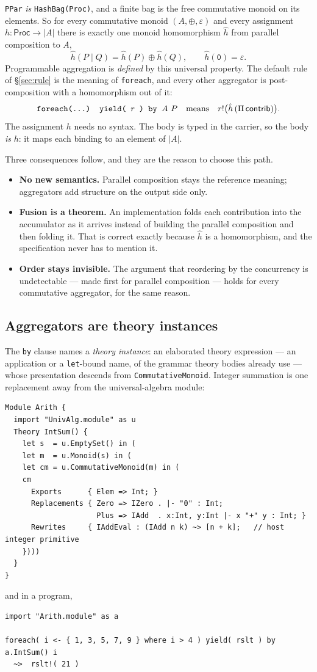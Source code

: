 \documentclass[11pt]{article}
\theoremstyle{branddef}
\theoremstyle{brandplain}
\theoremstyle{brandrem}
\newcommand{\Proc}{\mathsf{Proc}}
\newcommand{\fe}{\texttt{foreach}}
\begin{document}
\texttt{PPar} \emph{is} \texttt{HashBag(Proc)}, and a finite bag is the free
commutative monoid on its elements. So for every commutative monoid
\((A, \oplus, \varepsilon)\) and every assignment \(h : \Proc \to |A|\) there is
exactly one monoid homomorphism \(\hat h\) from parallel composition to \(A\),
\[
\hat h(P \mid Q) = \hat h(P) \oplus \hat h(Q),
\qquad
\hat h(\texttt{0}) = \varepsilon .
\]
Programmable aggregation is \emph{defined} by this universal property. The
default rule of \S\ref{sec:rule} is the meaning of \fe{}, and every other
aggregator is post-composition with a homomorphism out of it:
\[
\texttt{foreach(\dots) yield( }r\texttt{ ) by }A\ P
\quad\text{means}\quad
r!\big(\hat h\,(\Pi\,\mathsf{contrib})\big).
\]
The assignment \(h\) needs no syntax. The body is typed in the carrier, so the
body \emph{is} \(h\): it maps each binding to an element of \(|A|\).

Three consequences follow, and they are the reason to choose this path.
\begin{itemize}[nosep]
\item \textbf{No new semantics.} Parallel composition stays the reference
meaning; aggregators add structure on the output side only.
\item \textbf{Fusion is a theorem.} An implementation folds each contribution
into the accumulator as it arrives instead of building the parallel composition
and then folding it. That is correct exactly because \(\hat h\) is a
homomorphism, and the specification never has to mention it.
\item \textbf{Order stays invisible.} The argument that reordering by the
concurrency is undetectable --- made first for parallel composition --- holds for
every commutative aggregator, for the same reason.
\end{itemize}

\subsection{Aggregators are theory instances}
\label{sec:instances}

The \texttt{by} clause names a \emph{theory instance}: an elaborated theory
expression --- an application or a \texttt{let}-bound name, of the grammar
theory bodies already use --- whose presentation descends from
\texttt{CommutativeMonoid}. Integer summation is one replacement away from the
universal-algebra module:
\begin{lstlisting}[language=mettail]
Module Arith {
  import "UnivAlg.module" as u
  Theory IntSum() {
    let s  = u.EmptySet() in (
    let m  = u.Monoid(s) in (
    let cm = u.CommutativeMonoid(m) in (
    cm
      Exports      { Elem => Int; }
      Replacements { Zero => IZero . |- "0" : Int;
                     Plus => IAdd  . x:Int, y:Int |- x "+" y : Int; }
      Rewrites     { IAddEval : (IAdd n k) ~> [n + k];   // host integer primitive
    })))
  }
}
\end{lstlisting}
and in a program,
\begin{lstlisting}
import "Arith.module" as a

foreach( i <- { 1, 3, 5, 7, 9 } where i > 4 ) yield( rslt ) by a.IntSum() i
  ~>  rslt!( 21 )
\end{lstlisting}
\end{document}
